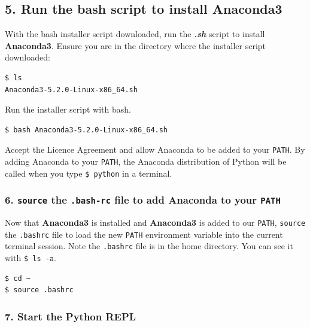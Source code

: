 \documentclass{book}
\begin{document}
    
        \subsection{\texorpdfstring{5. Run the bash script to install
\textbf{Anaconda3}}{5. Run the bash script to install Anaconda3}}\label{run-the-bash-script-to-install-anaconda3}

With the bash installer script downloaded, run the \textbf{\emph{.sh}}
script to install \textbf{Anaconda3}. Ensure you are in the directory
where the installer script downloaded:

\begin{lstlisting}
$ ls
Anaconda3-5.2.0-Linux-x86_64.sh
\end{lstlisting}

Run the installer script with bash.

\begin{lstlisting}
$ bash Anaconda3-5.2.0-Linux-x86_64.sh
\end{lstlisting}

Accept the Licence Agreement and allow Anaconda to be added to your
\lstinline!PATH!. By adding Anaconda to your \lstinline!PATH!, the
Anaconda distribution of Python will be called when you type
\lstinline!$ python! in a terminal.
    




    
        \subsubsection{\texorpdfstring{6. \texttt{source} the \texttt{.bash-rc}
file to add Anaconda to your
\texttt{PATH}}{6. source the .bash-rc file to add Anaconda to your PATH}}\label{source-the-.bash-rc-file-to-add-anaconda-to-your-path}

Now that \textbf{Anaconda3} is installed and \textbf{Anaconda3} is added
to our \lstinline!PATH!, \lstinline!source! the \lstinline!.bashrc! file
to load the new \lstinline!PATH! environment variable into the current
terminal session. Note the \lstinline!.bashrc! file is in the home
directory. You can see it with \lstinline!$ ls -a!.

\begin{lstlisting}
$ cd ~
$ source .bashrc
\end{lstlisting}
    




    
        \subsubsection{7. Start the Python REPL}\label{start-the-python-repl}
\end{document}
